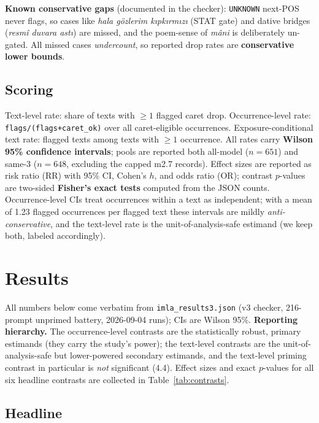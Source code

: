 \documentclass[11pt]{article}
\begin{document}
\textbf{Known conservative gaps} (documented in the checker): \texttt{UNKNOWN} next-POS never flags, so cases like \emph{hala g{\"o}zlerim k{\i}pk{\i}rm{\i}z{\i}} (STAT gate) and dative bridges (\emph{resm{\^i} duvara ast{\i}}) are missed, and the poem-sense of \emph{m{\^a}ni} is deliberately un-gated. All missed cases \emph{undercount}, so reported drop rates are \textbf{conservative lower bounds}.

\subsection{Scoring}

Text-level rate: share of texts with $\geq 1$ flagged caret drop. Occurrence-level rate: \texttt{flags/(flags+caret\_ok)} over all caret-eligible occurrences. Exposure-conditional text rate: flagged texts among texts with $\geq 1$ occurrence. All rates carry \textbf{Wilson 95\% confidence intervals}; pools are reported both all-model ($n{=}651$) and same-3 ($n{=}648$, excluding the capped m2.7 records). Effect sizes are reported as risk ratio (RR) with 95\% CI, Cohen's $h$, and odds ratio (OR); contrast $p$-values are two-sided \textbf{Fisher's exact tests} computed from the JSON counts. Occurrence-level CIs treat occurrences within a text as independent; with a mean of 1.23 flagged occurrences per flagged text these intervals are mildly \emph{anti-conservative}, and the text-level rate is the unit-of-analysis-safe estimand (we keep both, labeled accordingly).

\section{Results}
\label{sec:results}

All numbers below come verbatim from \texttt{imla\_results3.json} (v3 checker, 216-prompt unprimed battery, 2026-09-04 runs); CIs are Wilson 95\%. \textbf{Reporting hierarchy.} The occurrence-level contrasts are the statistically robust, primary estimands (they carry the study's power); the text-level contrasts are the unit-of-analysis-safe but lower-powered secondary estimands, and the text-level priming contrast in particular is \emph{not} significant (4.4). Effect sizes and exact $p$-values for all six headline contrasts are collected in Table~\ref{tab:contrasts}.

\subsection{Headline}
\end{document}
